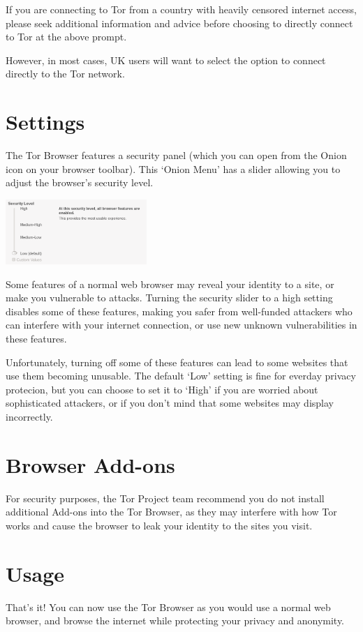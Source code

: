 \documentclass[10.5pt,a4paper]{article} %
\begin{document}
\begin{multicols*}{2}
If you are connecting to Tor from a country with heavily censored internet access, please seek additional information and advice before choosing to directly connect to Tor at the above prompt.

However, in most cases, UK users will want to select the option to connect directly to the Tor network.


\section*{Settings}
The Tor Browser features a security panel (which you can open from the Onion icon on your browser toolbar). This `Onion Menu' has a slider allowing you to adjust the browser's security level.

\begin{center}
	\includegraphics[width=0.40\textwidth]{onion-menu.png}
\end{center}

Some features of a normal web browser may reveal your identity to a site, or make you vulnerable to attacks. Turning the security slider to a high setting disables some of these features, making you safer from well-funded attackers who can interfere with your internet connection, or use new unknown vulnerabilities in these features.

Unfortunately, turning off some of these features can lead to some websites that use them becoming unusable. The default `Low' setting is fine for everday privacy protecion, but you can choose to set it to `High' if you are worried about sophisticated attackers, or if you don't mind that some websites may display incorrectly.


\section*{Browser Add-ons}
For security purposes, the Tor Project team recommend you do not install additional Add-ons into the Tor Browser, as they may interfere with how Tor works and cause the browser to leak your identity to the sites you visit.


\section*{Usage}
That's it! You can now use the Tor Browser as you would use a normal web browser, and browse the internet while protecting your privacy and anonymity.


\end{multicols*}
\end{document}
